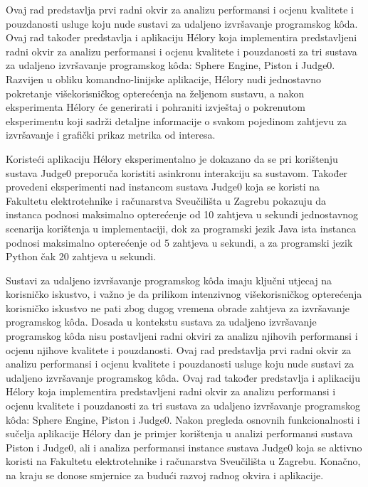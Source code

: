 \documentclass[times, utf8, diplomski]{fer}
\begin{document}
Ovaj rad predstavlja prvi radni okvir za analizu performansi i ocjenu kvalitete i pouzdanosti usluge koju nude sustavi za udaljeno izvršavanje programskog kôda. Ovaj rad također predstavlja i aplikaciju Hélory koja implementira predstavljeni radni okvir za analizu performansi i ocjenu kvalitete i pouzdanosti za tri sustava za udaljeno izvršavanje programskog kôda: Sphere Engine, Piston i Judge0. Razvijen u obliku komandno-linijske aplikacije, Hélory nudi jednostavno pokretanje višekorisničkog opterećenja na željenom sustavu, a nakon eksperimenta Hélory će generirati i pohraniti izvještaj o pokrenutom eksperimentu koji sadrži detaljne informacije o svakom pojedinom zahtjevu za izvršavanje i grafički prikaz metrika od interesa.

Koristeći aplikaciju Hélory eksperimentalno je dokazano da se pri korištenju sustava Judge0 preporuča koristiti asinkronu interakciju sa sustavom. Također provedeni eksperimenti nad instancom sustava Judge0 koja se koristi na Fakultetu elektrotehnike i računarstva Sveučilišta u Zagrebu pokazuju da instanca podnosi maksimalno opterećenje od 10 zahtjeva u sekundi jednostavnog scenarija korištenja u  implementaciji, dok za programski jezik Java ista instanca podnosi maksimalno opterećenje od 5 zahtjeva u sekundi, a za programski jezik Python čak 20 zahtjeva u sekundi.




\begin{sazetak}
Sustavi za udaljeno izvršavanje programskog kôda imaju ključni utjecaj na korisničko iskustvo, i važno je da prilikom intenzivnog višekorisničkog opterećenja korisničko iskustvo ne pati zbog dugog vremena obrade zahtjeva za izvršavanje programskog kôda. Dosada u kontekstu sustava za udaljeno izvršavanje programskog kôda nisu postavljeni radni okviri za analizu njihovih performansi i ocjenu njihove kvalitete i pouzdanosti. Ovaj rad predstavlja prvi radni okvir za analizu performansi i ocjenu kvalitete i pouzdanosti usluge koju nude sustavi za udaljeno izvršavanje programskog kôda. Ovaj rad također predstavlja i aplikaciju Hélory koja implementira predstavljeni radni okvir za analizu performansi i ocjenu kvalitete i pouzdanosti za tri sustava za udaljeno izvršavanje programskog kôda: Sphere Engine, Piston i Judge0. Nakon pregleda osnovnih funkcionalnosti i sučelja aplikacije Hélory dan je primjer korištenja u analizi performansi sustava Piston i Judge0, ali i analiza performansi instance sustava Judge0 koja se aktivno koristi na Fakultetu elektrotehnike i računarstva Sveučilišta u Zagrebu. Konačno, na kraju se donose smjernice za budući razvoj radnog okvira i aplikacije.

\end{sazetak}
\end{document}
